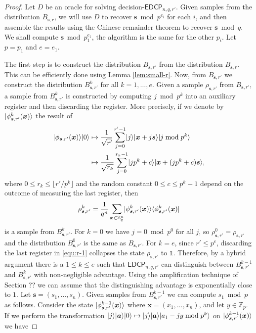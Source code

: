\documentclass[11pt]{article}
\theoremstyle{plain}
\theoremstyle{definition}
\DeclarePairedDelimiter{\ket}{\lvert}{\rangle}
\DeclarePairedDelimiter{\bra}{\langle}{\rvert}
\def\Z{\ensuremath{\mathbb{Z}}}
\def\edcp{\ensuremath{\mathsf{EDCP}}}
\begin{document}
\begin{proof}
    Let $D$ be an oracle for solving decision-$\edcp_{n, q, r'}$. Given samples from the distribution $B_{\bm{s}, r}$, we will use $D$ to recover $\bm{s} \bmod p^{e_i}$ for each $i$, and then assemble the results using the Chinese remainder theorem to recover $\bm{s} \bmod q$. We shall compute $\bm{s} \bmod p_1^{e_1}$, the algorithm is the same for the other $p_i$. Let $p = p_1$ and $e = e_1$.

    The first step is to construct the distribution $B_{\bm{s}, r'}$ from the distribution $B_{\bm{s}, r}$. This can be efficiently done using Lemma \ref{lem:small-r}. Now, from $B_{\bm{s}, r'}$ we construct the distribution $B_{\bm{s}, r'}^k$ for all $k = 1, \dots, e$. Given a sample $\rho_{\bm{s}, r'}$ from $B_{\bm{s}, r'}$, a sample from $B_{\bm{s}, r'}^k$ is constructed by computing $j \bmod p^k$ into an auxiliary register and then discarding the register. More precisely, if we denote by  $\ket{\phi_{\bm{s}, r'}^k(\bm{x})}$ the result of 
    \begin{align}
        \ket{\phi_{\bm{s}, r'}(\bm{x})}\ket{0}
        & \mapsto \frac{1}{\sqrt{r'}} \sum_{j = 0}^{r' - 1} \ket{j}\ket{\bm{x} + j\bm{s}}\ket{j \bmod p^k} \label{equ:r-1}  \\
        & \mapsto \frac{1}{\sqrt{r_k}} \sum_{j = 0}^{r_k - 1} \ket{jp^k + c}\ket{\bm{x} + (jp^k + c)\bm{s}}, \nonumber
    \end{align}
    where $0 \le r_k \le \lfloor r' / p^k \rfloor$ and the random constant $0 \le c \le p^k - 1$ depend on the outcome of measuring the last register, then
    \[ \rho_{\bm{s}, r'}^k = \frac{1}{q^n} \sum_{\bm{x} \in \Z_q^n} \ket{\phi_{\bm{s}, r'}^k(\bm{x})} \bra{\phi_{\bm{s}, r'}^k(\bm{x})} \]
    is a sample from $B_{\bm{s}, r'}^k$. For $k = 0$ we have $j = 0 \bmod p^0$ for all $j$, so $\rho_{\bm{s}, r'}^0 = \rho_{\bm{s}, r'}$ and the distribution $B_{\bm{s}, r'}^0$ is the same as $B_{\bm{s}, r'}$. For $k = e$, since $r' \le p^e$, discarding the last register in \eqref{equ:r-1} collapses the state $\rho_{\bm{s}, r'}$ to $\mathds{1}$. Therefore, by a hybrid argument there is a $1 \le k \le e$ such that $\edcp_{n, q, r'}$ can distinguish between $B_{\bm{s}, r'}^{k - 1}$ and $B_{\bm{s}, r'}^k$ with non-negligible advantage. Using the amplification technique of Section ?? we can assume that the distinguishing advantage is exponentially close to $1$. Let $\bm{s} = (s_1, \dots, s_n)$. Given samples from $B_{\bm{s}, r'}^{k - 1}$ we can compute $s_1 \bmod p$ as follows. Consider the state $\ket{\phi_{\bm{s}, r'}^{k - 1}(\bm{x})}$ where $\bm{x} = (x_1, \dots, x_n)$, and let $y \in \Z_p$. If we perform the transformation $\ket{j}\ket{\bm{a}}\ket{0} \mapsto \ket{j}\ket{\bm{a}}\ket{a_1 - jy \bmod p^k}$ on $\ket{\phi_{\bm{s}, r'}^{k - 1}(\bm{x})}$ we have

\end{proof}
\end{document}
